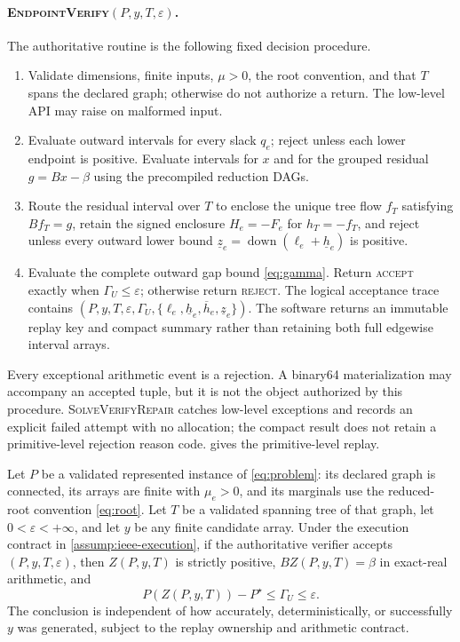 \documentclass[smallextended,envcountsect]{svjour3}
\begin{document}
\paragraph{\textnormal{\textsc{EndpointVerify}}$(P,y,T,\varepsilon)$.}
The authoritative routine is the following fixed decision procedure.
\begin{enumerate}[leftmargin=*,itemsep=1pt]
 \item Validate dimensions, finite inputs, $\mu>0$, the root convention, and
 that $T$ spans the declared graph; otherwise do not authorize a return.  The
 low-level API may raise on malformed input.
 \item Evaluate outward intervals for every slack $q_e$; reject unless each
 lower endpoint is positive.  Evaluate intervals for $x$ and for the grouped
 residual $g=Bx-\beta$ using the precompiled reduction DAGs.
 \item Route the residual interval over $T$ to enclose the unique tree flow
 $f_T$ satisfying $Bf_T=g$, retain the signed enclosure
 $H_e=-F_e$ for $h_T=-f_T$, and reject unless every outward lower bound
 $\underline z_e=\operatorname{down}(\ell_e+\underline h_e)$ is positive.
 \item Evaluate the complete outward gap bound \cref{eq:gamma}.  Return
 \textsc{accept} exactly when $\Gamma_U\le\varepsilon$; otherwise return
 \textsc{reject}.  The logical acceptance trace contains
 $(P,y,T,\varepsilon,\Gamma_U,
 \{\ell_e,\underline h_e,\overline h_e,\underline z_e\})$.  The software returns an
 immutable replay key and compact summary rather than retaining both full
 edgewise interval arrays.
\end{enumerate}
Every exceptional arithmetic event is a rejection.  A binary64 materialization
may accompany an accepted tuple, but it is not the object authorized by this
procedure.  \textsc{SolveVerifyRepair} catches low-level exceptions and records
an explicit failed attempt with no allocation; the compact result does not
retain a primitive-level rejection reason code.  
gives the primitive-level replay.

\begin{theorem}
\label{thm:soundness}
Let $P$ be a validated represented instance of \cref{eq:problem}: its declared
graph is connected, its arrays are finite with $\mu_e>0$, and its marginals use
the reduced-root convention \cref{eq:root}.  Let $T$ be a validated spanning
tree of that graph, let $0<\varepsilon<+\infty$, and let $y$ be any finite
candidate array.  Under the execution contract in
\cref{assump:ieee-execution}, if the authoritative verifier accepts
$(P,y,T,\varepsilon)$, then $Z(P,y,T)$ is strictly positive,
$BZ(P,y,T)=\beta$ in exact-real arithmetic, and
\begin{equation}
 P(Z(P,y,T))-P^\star\le\Gamma_U\le\varepsilon.
 \label{eq:sound-gap}
\end{equation}
The conclusion is independent of how accurately, deterministically, or
successfully $y$ was generated, subject to the replay ownership and arithmetic
contract.
\end{theorem}
\end{document}
